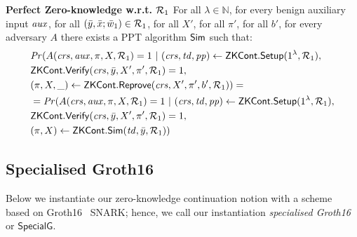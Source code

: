 \begin{definition}[ZK Continuations]
\noindent \textbf{Perfect Zero-knowledge w.r.t. $\mathcal{R}_1$} For all $\lambda \in \mathbb{N}$, for every benign auxiliary input $\mathit{aux}$, 
for all  $(\bar{y}, \bar{x}; \bar{w}_1) \in \mathcal{R}_1$, for all $X'$, for all $\pi'$, for all $b'$, for every adversary $A$ there exists a PPT algorithm $ {\mathsf{Sim}} $ such that:
\begin{align*}
& \mathit{Pr} (A(\mathit{crs}, \mathit{aux}, \pi, X, \mathcal{R}_1) = 1 \ | \ (\mathit{crs}, \mathit{td}, \mathit{pp}) \leftarrow {\ensuremath{\mathsf{ZKCont}}}.{\mathsf{Setup}} (1^{\lambda}, \mathcal{R}_1), \\
                  & {\mathsf{ZKCont}}.{\mathsf{Verify}}(\mathit{crs}, \bar{y}, X', \pi', \mathcal{R}_1) = 1, \\
                  & (\pi, X, \_) \leftarrow {\ensuremath{\mathsf{ZKCont}}}.{\mathsf{Reprove}} (\mathit{crs}, X', \pi', b', \mathcal{R}_1)) =  \\
& = \mathit{Pr}(A(\mathit{crs}, \mathit{aux}, \pi, X, \mathcal{R}_1) = 1 \ | \ (\mathit{crs}, \mathit{td}, \mathit{pp}) \leftarrow {\ensuremath{\mathsf{ZKCont}}}.{\mathsf{Setup}} (1^{\lambda}, \mathcal{R}_1), \\ 
                     & {\mathsf{ZKCont}}.{\mathsf{Verify}}(\mathit{crs}, \bar{y}, X', \pi', \mathcal{R}_1) = 1, \\ 
                     & (\pi, X) \leftarrow {\ensuremath{\mathsf{ZKCont}}}.{\mathsf{Sim}}(\mathit{td}, \bar{y}, \mathcal{R}_1))
\end{align*} 
\end{definition} 


\subsection{Specialised Groth16}
\label{sec:rvrf_groth16}

Below we instantiate our zero-knowledge continuation notion with a scheme based on Groth16~\cite{Groth16} SNARK;
hence, we call our instantiation \emph{specialised Groth16} or \emph{$\mathsf{SpecialG}$}.

